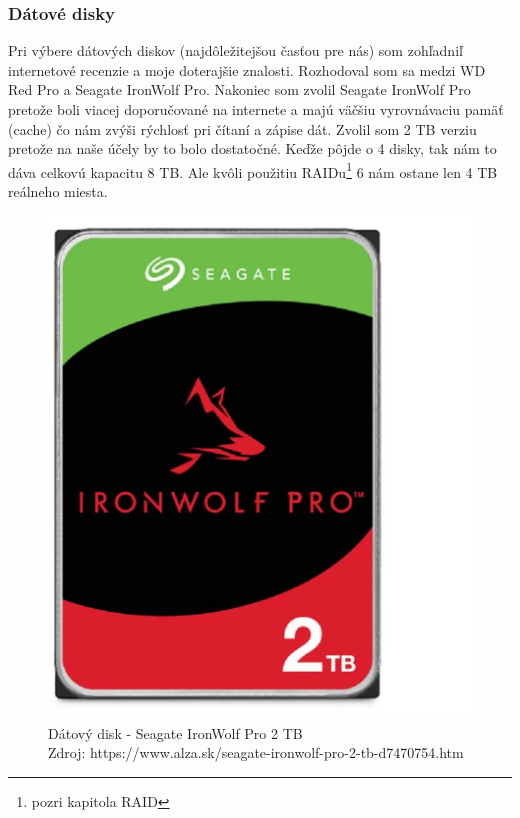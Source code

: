 \documentclass[12pt,oneside,slovak,a4paper]{article}
\begin{document}
\subsubsection{Dátové disky}
Pri výbere dátových diskov (najdôležitejšou časťou pre nás) som zohľadniľ internetové recenzie a moje doterajšie znalosti. Rozhodoval som sa medzi WD Red Pro a Seagate IronWolf Pro. Nakoniec som zvolil Seagate IronWolf Pro pretože boli viacej doporučované na internete a majú väčšiu vyrovnávaciu pamäť (cache) čo nám zvýši rýchlosť pri čítaní a zápise dát. Zvolil som 2 TB verziu pretože na naše účely by to bolo dostatočné. Keďže pôjde o 4 disky, tak nám to dáva celkovú kapacitu 8 TB. Ale kvôli použitiu RAIDu\footnote{pozri kapitola RAID} 6 nám ostane len 4 TB reálneho miesta.

\begin{figure}[H]
	\centering
	\captionsetup{justification=centering,margin=2cm}
	\includegraphics[scale=0.2]{./images/data-drive.png} %
	\centering
	\caption{Dátový disk - Seagate IronWolf Pro 2 TB \\ Zdroj: https://www.alza.sk/seagate-ironwolf-pro-2-tb-d7470754.htm}
\end{figure}
\end{document}
